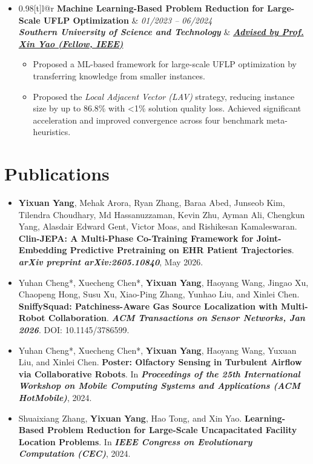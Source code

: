 \documentclass[a4paper,11pt]{article}
\makeatletter
\newcommand{\resumeSubheading}[4]{
\item
  \begin{tabular*}{0.98\textwidth}[t]{l@{\extracolsep{\fill}}r}
    \textbf{#1} & \textit{\footnotesize{#4}} \\
    \textit{\footnotesize{#3}} & \footnotesize{#2}\\
  \end{tabular*}
  \vspace{0.5mm}
}
\makeatother
\begin{document}
\begin{itemize}[leftmargin=0in, label={}]
    \resumeSubheading
    {Machine Learning-Based Problem Reduction for Large-Scale UFLP Optimization \hspace{-40mm}}{\href{https://scholar.google.co.uk/citations?user=UUtYPl4AAAAJ&hl=en}{\textit{\textbf{Advised by Prof. Xin Yao (Fellow, IEEE)}}}}
    {\textup{\textbf{Southern University of Science and Technology}}}{01/2023 -- 06/2024}
    \begin{itemize}
      \item {\footnotesize Proposed a ML-based framework for large-scale UFLP optimization by transferring knowledge from smaller instances.}
      \item {\footnotesize Proposed the \textit{Local Adjacent Vector (LAV)} strategy, reducing instance size by up to 86.8\% with <1\% solution quality loss. Achieved significant acceleration and improved convergence across four benchmark meta-heuristics.}
    \end{itemize}

\end{itemize}

\vspace{-3mm}
\section{\textbf{Publications}}
\begin{itemize}[leftmargin=3ex, itemsep=0pt]

  \item {\footnotesize \textbf{Yixuan Yang}, Mehak Arora, Ryan Zhang, Baraa Abed, Junseob Kim, Tilendra Choudhary, Md Hassanuzzaman, Kevin Zhu, Ayman Ali, Chengkun Yang, Alasdair Edward Gent, Victor Moas, and Rishikesan Kamaleswaran. \textbf{Clin-JEPA: A Multi-Phase Co-Training Framework for Joint-Embedding Predictive Pretraining on EHR Patient Trajectories}. \textit{\textbf{arXiv preprint arXiv:2605.10840}}, May 2026.}

  \item {\footnotesize Yuhan Cheng*, Xuecheng Chen*, \textbf{Yixuan Yang}, Haoyang Wang, Jingao Xu, Chaopeng Hong, Susu Xu, Xiao-Ping Zhang, Yunhao Liu, and Xinlei Chen. \textbf{SniffySquad: Patchiness-Aware Gas Source Localization with Multi-Robot Collaboration}. \textit{\textbf{ACM Transactions on Sensor Networks, Jan 2026}}. DOI: 10.1145/3786599.}

  \item {\footnotesize Yuhan Cheng*, Xuecheng Chen*, \textbf{Yixuan Yang}, Haoyang Wang, Yuxuan Liu, and Xinlei Chen. \textbf{Poster: Olfactory Sensing in Turbulent Airflow via Collaborative Robots}. In \textit{\textbf{Proceedings of the 25th International Workshop on Mobile Computing Systems and Applications (ACM HotMobile)}}, 2024.}

  \item {\footnotesize Shuaixiang Zhang, \textbf{Yixuan Yang}, Hao Tong, and Xin Yao. \textbf{Learning-Based Problem Reduction for Large-Scale Uncapacitated Facility Location Problems}. In \textit{\textbf{IEEE Congress on Evolutionary Computation (CEC)}}, 2024.}

\end{itemize}
\end{document}
